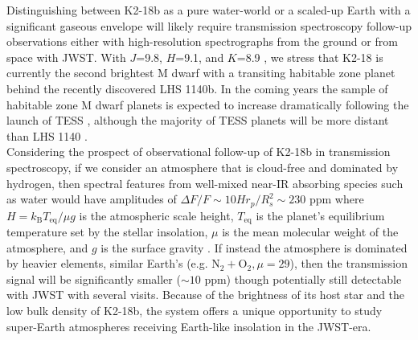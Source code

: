 Distinguishing between K2-18b as a pure water-world or a scaled-up Earth with a significant gaseous
envelope will likely require transmission spectroscopy follow-up observations either with high-resolution
spectrographs from the ground 
or from space with JWST. With $J$=9.8, $H$=9.1, and $K$=8.9 \citep{cutri03},
we stress that K2-18 is currently the second brightest M dwarf with a transiting
habitable zone planet behind the recently discovered LHS 1140b. In the coming years the sample of
habitable zone M dwarf planets is expected to increase dramatically following the launch of TESS
\citep{ricker14}, although the majority of TESS planets will be more distant than LHS 1140 \citep{sullivan15}. \\

Considering the prospect of observational follow-up of K2-18b in transmission spectroscopy, if we
consider an atmosphere that is
cloud-free and dominated by hydrogen, then spectral features from well-mixed near-IR absorbing species
such as water would have amplitudes of $\Delta F/F \sim 10H r_p/R_s^2 \sim 230$ ppm where
$H=k_{\text{B}}T_{\text{eq}}/\mu g$ is the atmospheric scale height, $T_{\text{eq}}$ is the planet's equilibrium
temperature set by the stellar insolation, $\mu$ is the mean molecular weight of the atmosphere, and $g$ is the
surface gravity \citep{millerricci09, kaltenegger09}. If instead the atmosphere is dominated
by heavier elements, similar Earth's (e.g. $\text{N}_2 + \text{O}_2, \mu=29$),
then the transmission signal will be significantly smaller ($\sim 10$ ppm) though potentially
still detectable with JWST with several visits. Because of the brightness of its host star and the low bulk
density of K2-18b, the system offers a unique opportunity to study super-Earth atmospheres receiving
Earth-like insolation in the JWST-era.


